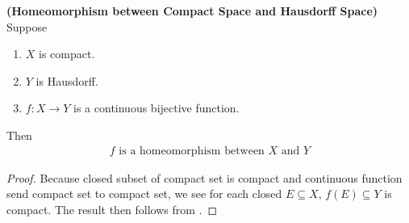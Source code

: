 \documentclass{report}
\begin{document}
\begin{corollary}
\label{HbC}
\textbf{(Homeomorphism between Compact Space and Hausdorff Space)} Suppose 
\begin{enumerate}[label=(\alph*)]
  \item $X$ is compact.  
  \item $Y$ is Hausdorff.  
  \item $f:X\rightarrow Y$ is a continuous bijective function. 
\end{enumerate}
Then 
\begin{align*}
f\text{ is a homeomorphism between }X\text{ and }Y
\end{align*}
\end{corollary}
\begin{proof}
Because closed subset of compact set is compact and continuous function send compact set to compact set, we see for each closed $E\subseteq X$, $f(E)\subseteq Y$ is compact. The result then follows from . 
\end{proof}
\end{document}
